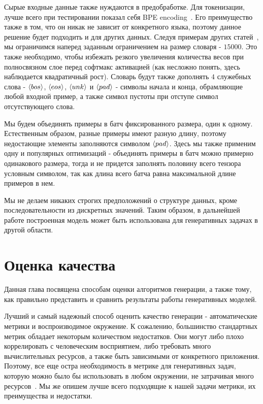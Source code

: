 \documentclass{spbau-diploma}
\begin{document}
Сырые входные данные также нуждаются в предобработке. Для токенизации, лучше 
всего при тестировании показал себя BPE encoding~\cite{wiki:bpe}. Его 
преимущество также в том, что он никак не зависит от конкретного языка, поэтому 
данное решение будет подходить и для других данных. Следуя примерам других 
статей~\cite{text_vae}, мы ограничимся наперед заданным ограничением на размер 
словаря - $15000$. Это также необходимо, чтобы избежать резкого увеличения 
количества весов при полносвязном слое перед софтмакс активацией (как несложно 
понять, здесь наблюдается квадратичный рост). Словарь будут также дополнять $4$ 
служебных слова - $\langle bos \rangle$, $\langle eos \rangle$, $\langle unk \rangle$ и $\langle pad \rangle$ - символы начала и конца, 
обрамляющие любой входной пример, а также символ пустоты при отступе символ
отсутствующего слова.

Мы будем объединять примеры в батч фиксированного размера, один к одному. 
Естественным образом, разные примеры имеют разную длину, поэтому недостающие
элементы заполняются символом $\langle pad \rangle$. Здесь мы также применим одну и популярных 
оптимизаций - объединять примеры в батч можно примерно одинакового размера, 
тогда и не придется заполнять половину всего тензора условным символом, так как 
длина всего батча равна максимальной длине примеров в нем.

Мы не делаем никаких строгих предположений о структуре данных, 
кроме последовательности из дискретных значений. 
Таким образом, в дальнейшей работе построенная модель может быть использована 
для генеративных задачах в другой области.

\section{Оценка качества}
Данная глава посвящена способам оценки алгоритмов генерации, а также тому, как 
правильно представить и сравнить результаты работы генеративных моделей.

Лучший и самый надежный способ оценить качество генерации - автоматические 
метрики и воспроизводимое окружение. К сожалению, большинство стандартных метрик
обладает некоторым количеством недостатков. Они могут либо плохо коррелировать
с человеческим восприятием, либо требовать много вычислительных 
ресурсов, а также быть зависимыми от конкретного приложения. Поэтому, все еще 
остра необходимость в метрике для генеративных задач, которую можно было бы 
использовать в любом окружении, не затрачивая много ресурсов~\cite{book:salp}.
Мы же опишем лучше всего подходящие к нашей задачи метрики, 
их преимущества и недостатки.
\end{document}
